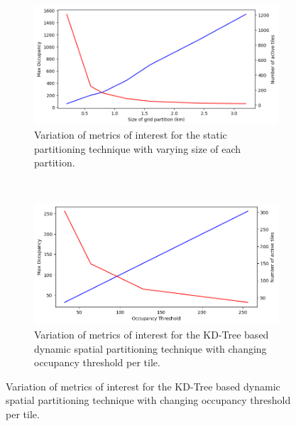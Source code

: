 \begin{figure}
\centering
\begin{subfigure}{0.45\textwidth}
  \centering
  \includegraphics[width=\linewidth]{figures/design_space/spatial/metrics_Grid.png}
  \caption{Variation of metrics of interest for the static partitioning technique with varying size of each partition.}
  \label{fig:static_part}
\end{subfigure}
~~~~
\begin{subfigure}{0.45\textwidth}
  \centering
  \includegraphics[width=\linewidth]{figures/design_space/spatial/metrics_KDTree.png}
  \caption{Variation of metrics of interest for the KD-Tree based dynamic spatial partitioning technique with changing occupancy threshold per tile.}
  \label{fig:kdtree_part}
\end{subfigure}\par\medskip
\end{figure}

